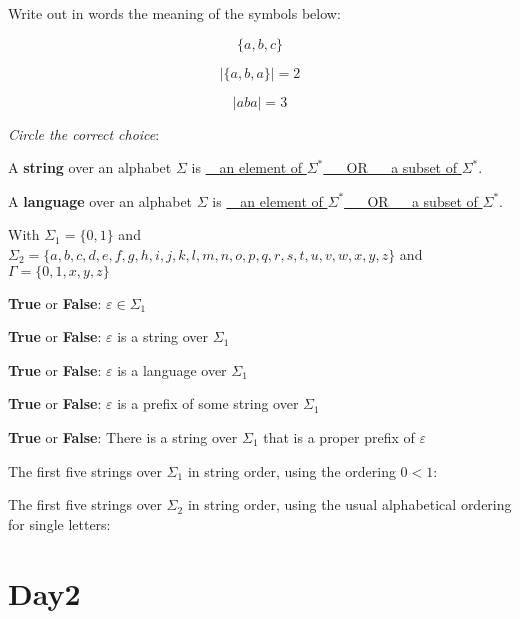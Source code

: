 \documentclass[12pt, oneside]{article}
\begin{document}
\vfill
    
\newpage
Write out in words the meaning of the symbols below: 

\[
    \{ a, b, c\}
\]

\phantom{The set whose elements are $a$, $b$, and $c$}

\[
    | \{a, b, a \} | = 2
\]


\[
    | aba | = 3
\]

\phantom{The length of the string $aba$ is $3$.}

\begin{comment}

\[
    (a, 3, 2, b, b)
\]

\phantom{The $5$-tuple whose first components is $a$, second component 
is $3$, third component is $2$, fourth component is $b$, and fifth component is $b$.}
\end{comment}

{\it Circle the correct choice}:

A {\bf string} over an alphabet $\Sigma$ is \underline{~~an element of $\Sigma^*$ ~~ OR ~~ a subset of $\Sigma^*$}.
    
A {\bf language} over an alphabet $\Sigma$ is \underline{~~an element of $\Sigma^*$ ~~ OR ~~ a subset of $\Sigma^*$}.


With $\Sigma_1 = \{0,1\}$ and 
$\Sigma_2 = \{a,b,c,d,e,f,g,h,i,j,k,l,m,n,o,p,q,r,s,t,u,v,w,x,y,z\}$
and $\Gamma = \{0,1,x,y,z\}$

{\bf True} or {\bf False}: $\varepsilon \in \Sigma_1$

{\bf True} or {\bf False}: $\varepsilon$ is  a string over $\Sigma_1$

{\bf True} or {\bf False}: $\varepsilon$ is a language over $\Sigma_1$

{\bf True} or {\bf False}: $\varepsilon$ is a prefix of some string over  $\Sigma_1$

{\bf True} or {\bf False}: There is a string over $\Sigma_1$ that is a proper prefix of $\varepsilon$
    

The first five strings over $\Sigma_1$ in string order, using the ordering $0 <  1$: \vfill
    
The first five strings over $\Sigma_2$ in string order, using the usual alphabetical ordering for single letters: \vfill



 \vfill
\section*{Day2}
\end{document}
